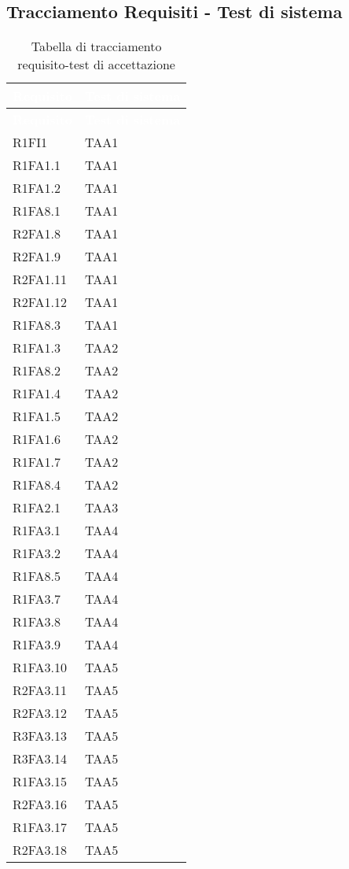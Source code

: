 \subsection{Tracciamento Requisiti - Test di sistema}
{
\renewcommand{\arraystretch}{1.5}
\centering
\begin{longtable}{C{4cm} C{4cm}}
\caption{Tabella di tracciamento requisito-test di accettazione}\\
\textcolor{white}{\textbf{Requisito}} & \textcolor{white}{\textbf{Test di sistema}}\\	
\endfirsthead
{}
\textcolor{white}{\textbf{Requisito}} & \textcolor{white}{\textbf{Test di sistema}}\\	
\endhead

R1FI1 & TAA1  \\
R1FA1.1 & TAA1  \\
R1FA1.2 & TAA1  \\
R1FA8.1 & TAA1  \\
R2FA1.8 & TAA1  \\
R2FA1.9 & TAA1  \\
R2FA1.11 & TAA1  \\ 
R2FA1.12 & TAA1  \\ 
R1FA8.3 & TAA1  \\

R1FA1.3 & TAA2  \\
R1FA8.2 & TAA2  \\
R1FA1.4 & TAA2  \\
R1FA1.5 & TAA2  \\
R1FA1.6 & TAA2  \\
R1FA1.7 & TAA2  \\
R1FA8.4 & TAA2  \\

R1FA2.1 & TAA3  \\

R1FA3.1 & TAA4  \\
R1FA3.2 & TAA4  \\
R1FA8.5 & TAA4  \\
R1FA3.7 & TAA4  \\
R1FA3.8 & TAA4  \\
R1FA3.9 & TAA4  \\

R1FA3.10 & TAA5  \\
R2FA3.11 & TAA5  \\
R2FA3.12 & TAA5  \\
R3FA3.13 & TAA5  \\
R3FA3.14 & TAA5  \\
R1FA3.15 & TAA5  \\
R2FA3.16 & TAA5  \\
R1FA3.17 & TAA5  \\
R2FA3.18 & TAA5  \\


\end{longtable}}

